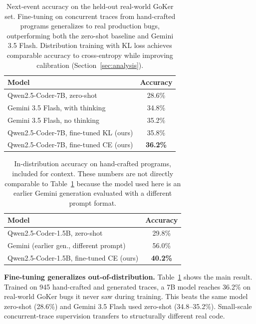 \documentclass{svproc}
\begin{document}
\begin{table}[t]
\centering
\caption{Next-event accuracy on the held-out real-world GoKer set.
Fine-tuning on concurrent traces from hand-crafted programs generalizes
to real production bugs, outperforming both the zero-shot baseline and
Gemini 3.5 Flash. Distribution training with KL loss achieves
comparable accuracy to cross-entropy while improving calibration
(Section~\ref{sec:analysis}).}
\label{tab:ood}
\small
\begin{tabular}{p{6.8cm}c}
\toprule
\textbf{Model} & \textbf{Accuracy}\\
\midrule
Qwen2.5-Coder-7B, zero-shot             & 28.6\%\\
Gemini 3.5 Flash, with thinking         & 34.8\%\\
Gemini 3.5 Flash, no thinking           & 35.2\%\\
Qwen2.5-Coder-7B, fine-tuned KL (ours) & 35.8\%\\
Qwen2.5-Coder-7B, fine-tuned CE (ours) & \textbf{36.2\%}\\
\bottomrule
\end{tabular}
\end{table}

\begin{table}[t]
\centering
\caption{In-distribution accuracy on hand-crafted programs, included
for context. These numbers are not directly comparable to
Table~\ref{tab:ood} because the model used here is an earlier Gemini
generation evaluated with a different prompt format.}
\label{tab:indist}
\small
\begin{tabular}{p{6.8cm}c}
\toprule
\textbf{Model} & \textbf{Accuracy}\\
\midrule
Qwen2.5-Coder-1.5B, zero-shot             & 29.8\%\\
Gemini (earlier gen., different prompt)   & 56.0\%\\
Qwen2.5-Coder-1.5B, fine-tuned CE (ours) & \textbf{40.2\%}\\
\bottomrule
\end{tabular}
\end{table}

\textbf{Fine-tuning generalizes out-of-distribution.}
Table~\ref{tab:ood} shows the main result. Trained on 945 hand-crafted
and generated traces, a 7B model reaches 36.2\% on real-world GoKer bugs
it never saw during training. This beats the same model zero-shot
(28.6\%) and Gemini 3.5 Flash used zero-shot (34.8--35.2\%).
Small-scale concurrent-trace supervision transfers to structurally
different real code.
\end{document}
